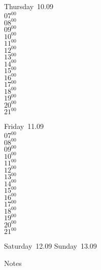 \documentclass[11pt,a4paper]{book}\usepackage[]{graphicx}\usepackage[]{color}
\begin{document}
{{{{{{{{{{\begin{tcolorbox}
Thursday~10.09\\
{ 
$07^{00}$\\
$08^{00}$\\
$09^{00}$\\
$10^{00}$\\
$11^{00}$\\
$12^{00}$\\
$13^{00}$\\
$14^{00}$\\
$15^{00}$\\
$16^{00}$\\
$17^{00}$\\
$18^{00}$\\
$19^{00}$\\
$20^{00}$\\
$21^{00}$}\\
\end{tcolorbox} 
%
\begin{tcolorbox}
Friday~11.09\\
{ 
$07^{00}$\\
$08^{00}$\\
$09^{00}$\\
$10^{00}$\\
$11^{00}$\\
$12^{00}$\\
$13^{00}$\\
$14^{00}$\\
$15^{00}$\\
$16^{00}$\\
$17^{00}$\\
$18^{00}$\\
$19^{00}$\\
$20^{00}$\\
$21^{00}$}\\
\end{tcolorbox} 
%
\begin{tcolorbox}[height=(\textheight-10mm)/6]
Saturday~12.09
\tcblower
Sunday~13.09
\end{tcolorbox} %
%
\begin{tcolorbox}[height=(\textheight-10mm)/6,sidebyside=false]
Notes
\end{tcolorbox}
\clearpage
\vspace{2 mm}\\
%
}}}}}}}}}}
\end{document}
